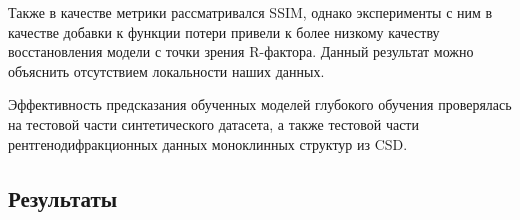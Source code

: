 \documentclass[a4paper,12pt]{article}
\begin{document}
{Также в качестве метрики рассматривался SSIM, однако эксперименты с ним в качестве добавки к функции потери привели к более низкому качеству восстановления модели с точки зрения R-фактора. Данный результат можно объяснить отсутствием локальности наших данных.

Эффективность предсказания обученных моделей глубокого обучения проверялась на тестовой части синтетического датасета, а также тестовой части рентгенодифракционных данных моноклинных структур из CSD.


\subsection*{Результаты}








}
\end{document}

